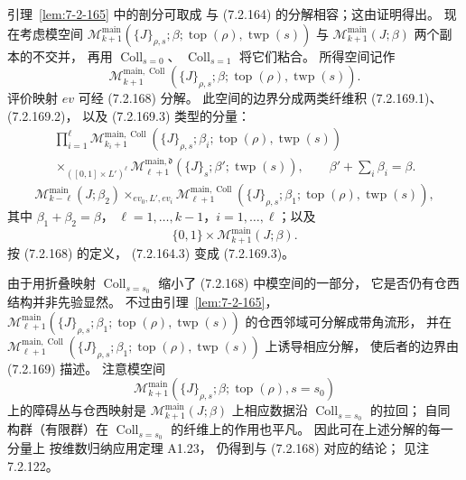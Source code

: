 引理~\ref{lem:7-2-165} 中的剖分可取成
与 (7.2.164) 的分解相容；这由证明得出。
现在考虑模空间
$\mathcal M_{k+1}^{\mathrm{main}}
(\{J\}_{\rho,s};\beta;
\operatorname{top}(\rho),\operatorname{twp}(s))$
与 $\mathcal M_{k+1}^{\mathrm{main}}(J;\beta)$
两个副本的不交并，
再用 $\operatorname{Coll}_{s=0}$、
$\operatorname{Coll}_{s=1}$ 将它们粘合。
所得空间记作
\begin{equation}
\mathcal M_{k+1}^{\mathrm{main},\operatorname{Coll}}
(\{J\}_{\rho,s};\beta;
\operatorname{top}(\rho),\operatorname{twp}(s)).
\tag{7.2.168}\label{eq:7-2-168}
\end{equation}
评价映射 $ev$ 可经 (7.2.168) 分解。
此空间的边界分成两类纤维积
(7.2.169.1)、(7.2.169.2)，
以及 (7.2.169.3) 类型的分量：
\begin{equation}
\begin{gathered}
\prod_{i=1}^{\ell}
\mathcal M_{k_i+1}^{\mathrm{main},\operatorname{Coll}}
(\{J\}_{\rho,s};\beta_i;
\operatorname{top}(\rho),\operatorname{twp}(s))
\\
\mathbin{\times_{([0,1]\times L')^\ell}}
\mathcal M_{\ell+1}^{\mathrm{main},\mathfrak d}
(\{J\}_s;\beta';\operatorname{twp}(s)),
\qquad\beta'+\sum_i\beta_i=\beta.
\end{gathered}
\tag{7.2.169.1}\label{eq:7-2-169-1}
\end{equation}
\begin{equation}
\mathcal M_{k-\ell}^{\mathrm{main}}(J;\beta_2)
\mathbin{\times_{ev_0,L',ev_i}}
\mathcal M_{\ell+1}^{\mathrm{main},\operatorname{Coll}}
(\{J\}_{\rho,s};\beta_1;
\operatorname{top}(\rho),\operatorname{twp}(s)),
\tag{7.2.169.2}\label{eq:7-2-169-2}
\end{equation}
其中 $\beta_1+\beta_2=\beta$，
$\ell=1,\ldots,k-1$，$i=1,\ldots,\ell$；以及
\begin{equation}
\{0,1\}\times\mathcal M_{k+1}^{\mathrm{main}}(J;\beta).
\tag{7.2.169.3}\label{eq:7-2-169-3}
\end{equation}
按 (7.2.168) 的定义，
(7.2.164.3) 变成 (7.2.169.3)。

由于用折叠映射 $\operatorname{Coll}_{s=s_0}$
缩小了 (7.2.168) 中模空间的一部分，
它是否仍有仓西结构并非先验显然。
不过由引理~\ref{lem:7-2-165}，
$\mathcal M_{\ell+1}^{\mathrm{main}}
(\{J\}_{\rho,s};\beta_1;
\operatorname{top}(\rho),\operatorname{twp}(s))$
的仓西邻域可分解成带角流形，
并在
$\mathcal M_{\ell+1}^{\mathrm{main},\operatorname{Coll}}
(\{J\}_{\rho,s};\beta_1;
\operatorname{top}(\rho),\operatorname{twp}(s))$
上诱导相应分解，
使后者的边界由 (7.2.169) 描述。
注意模空间
\[
\mathcal M_{k+1}^{\mathrm{main}}
(\{J\}_{\rho,s};\beta;
\operatorname{top}(\rho),s=s_0)
\]
上的障碍丛与仓西映射是
$\mathcal M_{k+1}^{\mathrm{main}}(J;\beta)$
上相应数据沿 $\operatorname{Coll}_{s=s_0}$ 的拉回；
自同构群（有限群）在
$\operatorname{Coll}_{s=s_0}$ 的纤维上的作用也平凡。
因此可在上述分解的每一分量上
按维数归纳应用定理 A1.23，
仍得到与 (7.2.168) 对应的结论；
见注 7.2.122。

